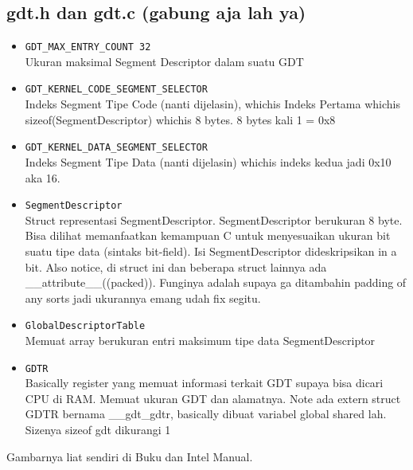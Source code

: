 \subsection{gdt.h dan gdt.c (gabung aja lah ya)}

\begin{itemize}
\item \texttt{GDT\_MAX\_ENTRY\_COUNT 32} \\
Ukuran maksimal Segment Descriptor dalam suatu GDT
\item \texttt{GDT\_KERNEL\_CODE\_SEGMENT\_SELECTOR} \\
Indeks Segment Tipe Code (nanti dijelasin), whichis Indeks Pertama whichis sizeof(SegmentDescriptor) whichis 8 bytes. 8 bytes kali 1 = 0x8
\item \texttt{GDT\_KERNEL\_DATA\_SEGMENT\_SELECTOR} \\
Indeks Segment Tipe Data (nanti dijelasin) whichis indeks kedua jadi 0x10 aka 16.
\item \texttt{SegmentDescriptor} \\
Struct representasi SegmentDescriptor. SegmentDescriptor berukuran 8 byte. Bisa dilihat memanfaatkan kemampuan C untuk menyesuaikan ukuran bit suatu tipe data (sintaks bit-field). Isi SegmentDescriptor dideskripsikan in a bit. Also notice, di struct ini dan beberapa struct lainnya ada \_\_attribute\_\_((packed)). Funginya adalah supaya ga ditambahin padding of any sorts jadi ukurannya emang udah fix segitu.
\item \texttt{GlobalDescriptorTable} \\
Memuat array berukuran entri maksimum tipe data SegmentDescriptor
\item \texttt{GDTR} \\
Basically register yang memuat informasi terkait GDT supaya bisa dicari CPU di RAM. Memuat ukuran GDT dan alamatnya. Note ada extern struct GDTR bernama \_\_gdt\_gdtr, basically dibuat variabel global shared lah. Sizenya sizeof gdt dikurangi 1
\end{itemize}

Gambarnya liat sendiri di Buku dan Intel Manual.

